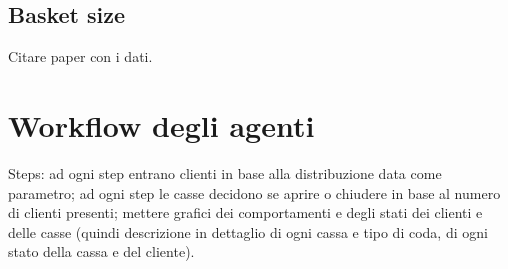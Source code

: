 \subsection{Basket size}
Citare paper con i dati.

\section{Workflow degli agenti}

Steps: ad ogni step entrano clienti in base alla distribuzione data come parametro; ad ogni step le casse decidono se aprire o chiudere in base al numero di clienti presenti; mettere grafici dei comportamenti e degli stati dei clienti e delle casse (quindi descrizione in dettaglio di ogni cassa e tipo di coda, di ogni stato della cassa e del cliente).